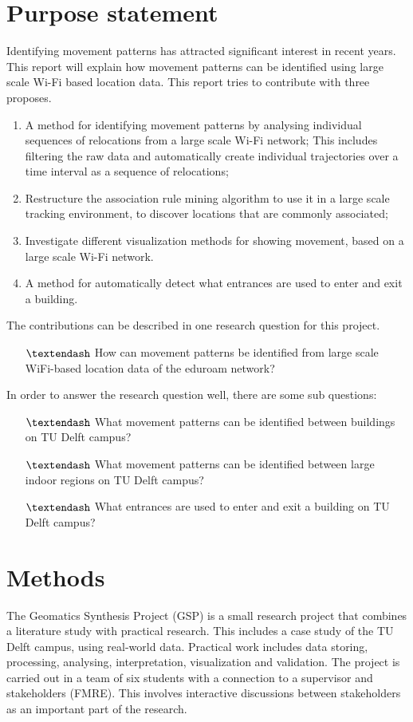\section{Purpose statement}\label{purpstate}
Identifying movement patterns has attracted significant interest in recent years. This report will explain how movement patterns can be identified using large scale Wi-Fi based location data. This report tries to contribute with three proposes.
\begin{enumerate}
\item A method for identifying movement patterns by analysing individual sequences of relocations from a large scale Wi-Fi network; This includes filtering the raw data and automatically create individual trajectories over a time interval as a sequence of relocations; 
\item Restructure the association rule mining algorithm to use it in a large scale tracking environment, to discover locations that are commonly associated; 
\item Investigate different visualization methods for showing movement, based on a large scale Wi-Fi network. 
\item A method for automatically detect what entrances are used to enter and exit a building.
\end {enumerate}

The contributions can be described in one research question for this project.
\begin{itemize}
\item[$\textendash$] How can movement patterns be identified from large scale WiFi-based location data of the eduroam network?
\end{itemize}
In order to answer the research question well, there are some sub questions:
\begin{itemize}
\item[$\textendash$] What movement patterns can be identified between buildings on TU Delft campus?
\item[$\textendash$] What movement patterns can be identified between large indoor regions on TU Delft campus?
\item[$\textendash$] What entrances are used to enter and exit a building on TU Delft campus?
\end{itemize}

\section{Methods}\label{methods}
The Geomatics Synthesis Project (GSP) is a small research project that combines a literature study with practical research. This includes a case study of the TU Delft campus, using real-world data. Practical work includes data storing, processing, analysing, interpretation, visualization and validation. The project is carried out in a team of six students with a connection to a supervisor and stakeholders (FMRE). This involves interactive discussions between stakeholders as an important part of the research. 
